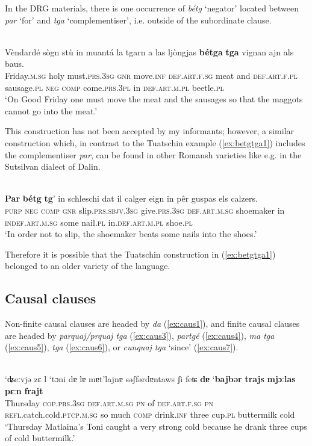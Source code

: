 In the DRG materials, there is one occurrence of \textit{bétg} `negator' located between \textit{par} `for' and \textit{tga} `complementiser', i.e. outside of the subordinate clause.

\ea
\label{ex:betgtga1}
\\
\gll Vèndardé sògn stù in muantá la tgarn a las ljòngjas \textbf{bétga} \textbf{tga} vignan ajn als baus.\\
Friday.\textsc{m.sg} holy must.\textsc{prs.3sg} \textsc{gnr} move.\textsc{inf} \textsc{def.art.f.sg} meat and \textsc{def.art.f.pl} sausage.\textsc{pl} \textsc{neg} \textsc{comp} come.\textsc{prs.3pl} in \textsc{def.art.m.pl} beetle.\textsc{pl}\\
\glt `On Good Friday one must move the meat and the sausages so that the maggots cannot go into the meat.'
\z

This construction has not been accepted by my informants; however, a similar construction which, in contrast to the Tuatschin example (\ref{ex:betgtga1}) includes the complementiser \textit{par}, can be found in other Romansh varieties like e.g. in the Sutsilvan dialect of Dalin.

\ea\label{ex:betgtga2}
\\
\gll  \textbf{Par} \textbf{bétg} \textbf{tg}' in schleschi dat il calger eign in pêr guspas els calzers.\\
     \textsc{purp} \textsc{neg} \textsc{comp} \textsc{gnr} slip.\textsc{prs.sbjv.3sg} give.\textsc{prs.3sg} \textsc{def.art.m.sg} shoemaker in \textsc{indef.art.m.sg} some nail.\textsc{pl} in.\textsc{def.art.m.pl} shoe.\textsc{pl}\\
\glt `In order not to slip, the shoemaker beats some nails into the shoes.'
\z

Therefore it is possible that the Tuatschin construction in (\ref{ex:betgtga1}) belonged to an older variety of the language.


\subsection{Causal clauses}
Non-finite causal clauses are headed by \textit{da} (\ref{ex:caus1}), and finite causal clauses are headed by \textit{parquaj/prquaj tga} (\ref{ex:caus3}), \textit{partgé} (\ref{ex:caus4}), \textit{ma tga} (\ref{ex:caus5}), \textit{tga} (\ref{ex:caus6}), or \textit{cunquaj tga} `since' (\ref{ex:caus7}).
 
 \ea
 \label{ex:caus1}
 \\
 \gll ‘ʥeːvjǝ zɛ l ‘tɔni dɐ lɐ mɐt’lajnɐ sǝʃfǝrdɐntaws ʃi feʨ \textbf{dɐ} ‘\textbf{bajbǝr} \textbf{trajs} \textbf{mjɔːlas} \textbf{pɛːn} \textbf{frajt}\\
 Thursday \textsc{cop.prs.3sg} \textsc{def.art.m.sg} \textsc{pn} of \textsc{def.art.f.sg} \textsc{pn} \textsc{refl}.catch.cold.\textsc{ptcp.m.sg} so much \textsc{comp} drink.\textsc{inf} three cup.\textsc{pl} buttermilk cold\\
 \glt `Thursday Matlaina’s Toni caught a very strong cold because he drank three cups of cold buttermilk.'
 \z

